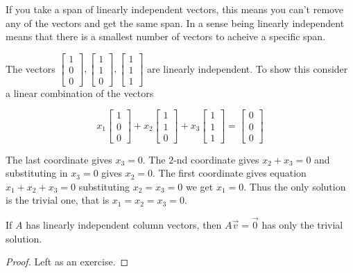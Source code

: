 \begin{remark}
If you take a span of linearly independent vectors, this means you can't remove any of the vectors and get the same span. In a sense being linearly independent means that there is a smallest number of vectors to acheive a specific span. 
\end{remark}

\begin{example} The vectors 
$\begin{bmatrix}1 \\ 0 \\ 0 \end{bmatrix},\begin{bmatrix}1 \\ 1 \\ 0 \end{bmatrix},\begin{bmatrix}1 \\ 1 \\ 1 \end{bmatrix}$ 
are linearly independent. To show this consider a linear combination of the vectors

\[
x_1\begin{bmatrix}1 \\ 0 \\ 0 \end{bmatrix}+x_2\begin{bmatrix}1 \\ 1 \\ 0 \end{bmatrix}+x_3\begin{bmatrix}1 \\ 1 \\ 1 \end{bmatrix}
=\begin{bmatrix}0 \\ 0 \\ 0 \end{bmatrix}
\]

The last coordinate gives $x_3=0$. The $2$-nd coordinate gives $x_2+x_3=0$ and substituting in $x_3=0$ gives $x_2=0$. The first coordinate gives equation 
$x_1+x_2+x_3=0$ substituting $x_2=x_3=0$ we get $x_1=0$. Thus the only solution is the trivial one, that is $x_1=x_2=x_3=0$.
\end{example}

\begin{proposition}\label{prop:ind_injective1} 
If $A$ has linearly independent column vectors, then $A\vec{v}=\vec{0}$ has only the trivial solution.
\end{proposition}
\begin{proof}
Left as an exercise.
\end{proof}

